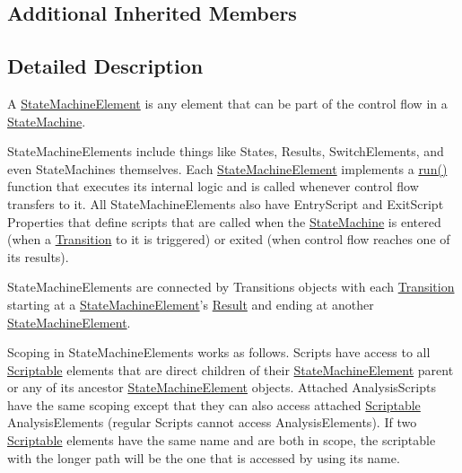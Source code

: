 \subsection*{Additional Inherited Members}


\subsection{Detailed Description}
A \hyperlink{class_picto_1_1_state_machine_element}{State\-Machine\-Element} is any element that can be part of the control flow in a \hyperlink{class_picto_1_1_state_machine}{State\-Machine}. 

State\-Machine\-Elements include things like States, Results, Switch\-Elements, and even State\-Machines themselves. Each \hyperlink{class_picto_1_1_state_machine_element}{State\-Machine\-Element} implements a \hyperlink{class_picto_1_1_state_machine_element_a7a1f1ca8905c111dd043178b9132c770}{run()} function that executes its internal logic and is called whenever control flow transfers to it. All State\-Machine\-Elements also have Entry\-Script and Exit\-Script Properties that define scripts that are called when the \hyperlink{class_picto_1_1_state_machine}{State\-Machine} is entered (when a \hyperlink{class_picto_1_1_transition}{Transition} to it is triggered) or exited (when control flow reaches one of its results).

State\-Machine\-Elements are connected by Transitions objects with each \hyperlink{class_picto_1_1_transition}{Transition} starting at a \hyperlink{class_picto_1_1_state_machine_element}{State\-Machine\-Element}'s \hyperlink{class_picto_1_1_result}{Result} and ending at another \hyperlink{class_picto_1_1_state_machine_element}{State\-Machine\-Element}.

Scoping in State\-Machine\-Elements works as follows. Scripts have access to all \hyperlink{class_picto_1_1_scriptable}{Scriptable} elements that are direct children of their \hyperlink{class_picto_1_1_state_machine_element}{State\-Machine\-Element} parent or any of its ancestor \hyperlink{class_picto_1_1_state_machine_element}{State\-Machine\-Element} objects. Attached Analysis\-Scripts have the same scoping except that they can also access attached \hyperlink{class_picto_1_1_scriptable}{Scriptable} Analysis\-Elements (regular Scripts cannot access Analysis\-Elements). If two \hyperlink{class_picto_1_1_scriptable}{Scriptable} elements have the same name and are both in scope, the scriptable with the longer path will be the one that is accessed by using its name.

